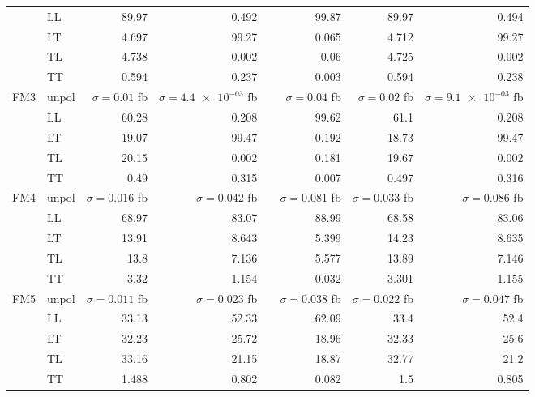 \begin{table}[h]
{\begin{tabular}{llrrrrrr}
 & LL & \num{89.97} & \num{0.492} &  & \num{99.87} & \num{89.97} & \num{0.494} \\
 & LT & \num{4.697} & \num{99.27} &  & \num{0.065} & \num{4.712} & \num{99.27} \\
 & TL & \num{4.738} & \num{0.002} &  & \num{0.06} & \num{4.725} & \num{0.002} \\
 & TT & \num{0.594} & \num{0.237} &  & \num{0.003} & \num{0.594} & \num{0.238} \\
\midrule
\multirow{5}{*}{FM3}
 & unpol & $\sigma = \num{0.01}$ fb & $\sigma = \num{4.4e-03}$ fb &  & $\sigma = \num{0.04}$ fb & $\sigma = \num{0.02}$ fb & $\sigma = \num{9.1e-03}$ fb \\
 & LL & \num{60.28} & \num{0.208} &  & \num{99.62} & \num{61.1} & \num{0.208} \\
 & LT & \num{19.07} & \num{99.47} &  & \num{0.192} & \num{18.73} & \num{99.47} \\
 & TL & \num{20.15} & \num{0.002} &  & \num{0.181} & \num{19.67} & \num{0.002} \\
 & TT & \num{0.49} & \num{0.315} &  & \num{0.007} & \num{0.497} & \num{0.316} \\
\midrule
\multirow{5}{*}{FM4}
 & unpol & $\sigma = \num{0.016}$ fb & $\sigma = \num{0.042}$ fb &  & $\sigma = \num{0.081}$ fb & $\sigma = \num{0.033}$ fb & $\sigma = \num{0.086}$ fb \\
 & LL & \num{68.97} & \num{83.07} &  & \num{88.99} & \num{68.58} & \num{83.06} \\
 & LT & \num{13.91} & \num{8.643} &  & \num{5.399} & \num{14.23} & \num{8.635} \\
 & TL & \num{13.8} & \num{7.136} &  & \num{5.577} & \num{13.89} & \num{7.146} \\
 & TT & \num{3.32} & \num{1.154} &  & \num{0.032} & \num{3.301} & \num{1.155} \\
\midrule
\multirow{5}{*}{FM5}
 & unpol & $\sigma = \num{0.011}$ fb & $\sigma = \num{0.023}$ fb &  & $\sigma = \num{0.038}$ fb & $\sigma = \num{0.022}$ fb & $\sigma = \num{0.047}$ fb \\
 & LL & \num{33.13} & \num{52.33} &  & \num{62.09} & \num{33.4} & \num{52.4} \\
 & LT & \num{32.23} & \num{25.72} &  & \num{18.96} & \num{32.33} & \num{25.6} \\
 & TL & \num{33.16} & \num{21.15} &  & \num{18.87} & \num{32.77} & \num{21.2} \\
 & TT & \num{1.488} & \num{0.802} &  & \num{0.082} & \num{1.5} & \num{0.805} \\

\end{tabular}}
\end{table}
